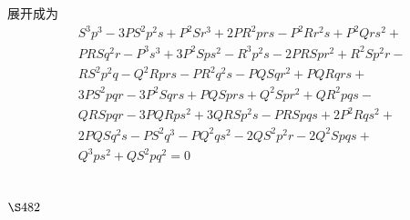 展开成为
\[
\begin{aligned}
& S^{3} p^{3}-3 P S^{2} p^{2} s+P^{2} S r^{3}+2 P R^{2} p r s-P^{2} R r^{2} s+P^{2} Q r s^{2}+ \\
& P R S q^{2} r-P^{3} s^{3}+3 P^{2} S p s^{2}-R^{3} p^{2} s-2 P R S p r^{2}+R^{2} S p^{2} r- \\
& R S^{2} p^{2} q-Q^{2} R p r s-P R^{2} q^{2} s-P Q S q r^{2}+P Q R q r s+ \\
& 3 P S^{2} p q r-3 P^{2} S q r s+P Q S p r s+Q^{2} S p r^{2}+Q R^{2} p q s- \\
& Q R S p q r-3 P Q R p s^{2}+3 Q R S p^{2} s-P R S p q s+2 P^{2} R q s^{2}+ \\
& 2 P Q S q^{2} s-P S^{2} q^{3}-P Q^{2} q s^{2}-2 Q S^{2} p^{2} r-2 Q^{2} S p q s+ \\
& Q^{3} p s^{2}+Q S^{2} p q^{2}=0
\end{aligned}
\]
\section{$\S 482$}

